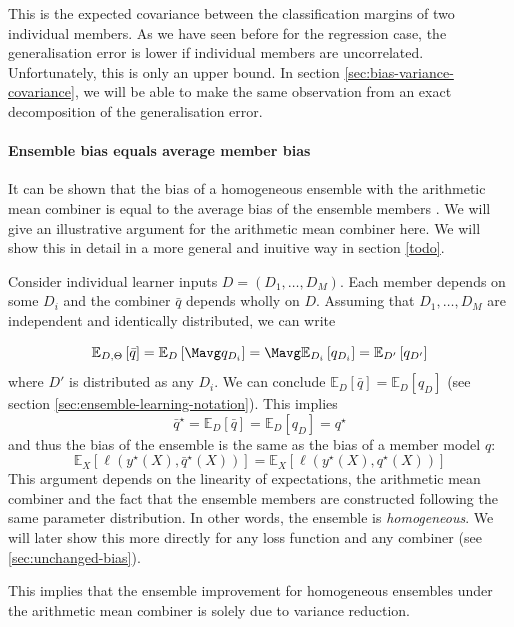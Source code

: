 \documentclass[
    a4paper, %
	fontsize=10pt, %
	twoside=false, %
]{kaobook}
\begin{document}
This
is the expected covariance between the classification margins of two individual members. As we have seen before for the regression case, the generalisation error is lower if individual members are uncorrelated. Unfortunately, this is only an upper bound. In section \ref{sec:bias-variance-covariance}, we will be able to make the same observation from an exact decomposition of the generalisation error.


\paragraph{Ensemble bias equals average member bias}
It can be shown that the bias of a homogeneous ensemble with the arithmetic mean combiner is equal to the average bias of the ensemble members \cite{louppe_UnderstandingRandomForests_2015}. We will give an illustrative argument for the arithmetic mean combiner here.
We will show this in detail in a more general and inuitive way in section \ref{todo}.

Consider individual learner inputs $D = (D_{1}, \dots, D_{M})$. Each member depends on some $D_{i}$ and the combiner $\bar{q}$ depends wholly on $D$. Assuming that $D_{1}, \dots, D_{M}$ are independent and identically distributed, we can write

$$
\mathbb{E}_{D, \Theta}\left[ \bar{q} \right] = \mathbb{E}_{D}\left[ \Mavg q_{D_{i}} \right] = \Mavg \mathbb{E}_{D_{i}}\left[ q_{D_{i}} \right] = \mathbb{E}_{D'}\left[ q_{D'} \right]
$$
where $D'$ is distributed as any $D_{i}$. We can conclude $\mathbb{E}_{D}\left[ \bar{q} \right] = \mathbb{E}_{D}\left[ q_{D} \right]$ (see section \ref{sec:ensemble-learning-notation}).
This implies
$$
\bar{q}^\star = \mathbb{E}_{D}\left[ \bar{q} \right]  = \mathbb{E}_{D}\left[ q_{D} \right]  = q^\star
$$
and thus the bias of the ensemble is the same as the bias of a member model $q$:
$$
\mathbb{E}_{X}\left[ \ell(y^\star(X), \bar{q}^\star(X)) \right] 
= \mathbb{E}_{X}\left[ \ell(y^\star(X), q^\star(X)) \right] 
$$
This argument depends on the linearity of expectations, the arithmetic mean combiner and the fact that the ensemble members are constructed following the same parameter distribution. In other words, the ensemble is \textit{homogeneous}. We will later show this more directly for any loss function and any combiner (see \ref{sec:unchanged-bias}).

This implies that the ensemble improvement for homogeneous ensembles under the arithmetic mean combiner is solely due to variance reduction.
\end{document}
